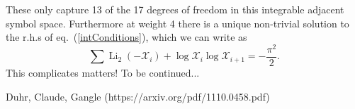 \documentclass[12pt]{article}
\DeclareMathOperator{\Li}{Li}
\def\x{\mathcal{X}}
\begin{document}
These only capture 13 of the 17 degrees of freedom in this integrable adjacent symbol space. Furthermore at weight 4 there is a unique non-trivial solution to the r.h.s of eq.~(\ref{intConditions}), which we can write as
\begin{equation}
	\sum \Li_2(-\x_i)+\log\x_i\log\x_{i+1} = -\frac{\pi^2}{2}.
\end{equation}
This complicates matters! To be continued...
\begin{thebibliography}{xx}
	 Duhr, Claude, Gangle (https://arxiv.org/pdf/1110.0458.pdf)
\end{thebibliography}
\end{document}
